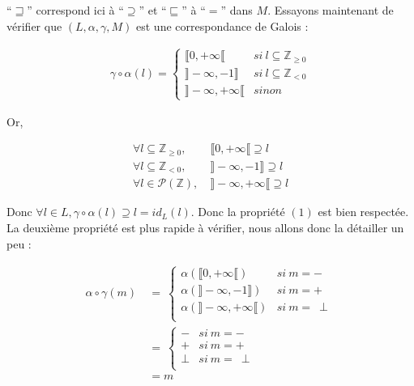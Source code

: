 \documentclass[french]{article}
\newcommand\si{\textit{si}}
\newcommand\sinon{\textit{sinon}}
\begin{document}
  ``$\sqsupseteq$'' correspond ici à ``$\supseteq$'' et ``$\sqsubseteq$'' à ``$=$'' dans $M$. Essayons maintenant de vérifier que $(L, \alpha, \gamma, M)$ est une correspondance de Galois :

  \begin{align*}
    \gamma \circ \alpha (l) = \left\{
    \begin{array}{ll}
      \llbracket 0, +\infty\llbracket & \si\ l \subseteq \mathds{Z}_{\geq 0}\\
      \rrbracket -\infty, -1\rrbracket & \si\ l \subseteq \mathds{Z}_{< 0}\\
      \rrbracket -\infty, +\infty\llbracket & \sinon\
    \end{array} \right.
  \end{align*}

  Or,

  \begin{align*}
    \forall l \subseteq \mathds{Z}_{\geq 0},\ & \llbracket 0, +\infty\llbracket \supseteq l\\
    \forall l \subseteq \mathds{Z}_{< 0},\    & \rrbracket -\infty, -1\rrbracket \supseteq l\\
    \forall l \in \mathscr{P}(\mathds{Z}),\   & \rrbracket -\infty, +\infty\llbracket \supseteq l
  \end{align*}

  Donc $\forall l \in L, \gamma \circ \alpha (l) \supseteq l = id_L(l)$. Donc la propriété $(1)$ est bien respectée.
  La deuxième propriété est plus rapide à vérifier, nous allons donc la détailler un peu :

  \begin{align*}
    \alpha \circ \gamma (m)\ &=\ \left\{
    \begin{array}{ll}
      \alpha (\llbracket 0, +\infty\llbracket) & \si\ m = -\\
      \alpha (\rrbracket -\infty, -1\rrbracket) & \si\ m = +\\
      \alpha (\rrbracket -\infty, +\infty\llbracket)  & \si\ m =\ \perp\\
    \end{array} \right.\\
    &= \ \left\{
    \begin{array}{ll}
      - & \si\ m = -\\
      + & \si\ m = +\\
      \perp  & \si\ m =\ \perp\\
    \end{array} \right.\\
    &= m
  \end{align*}
\end{document}
